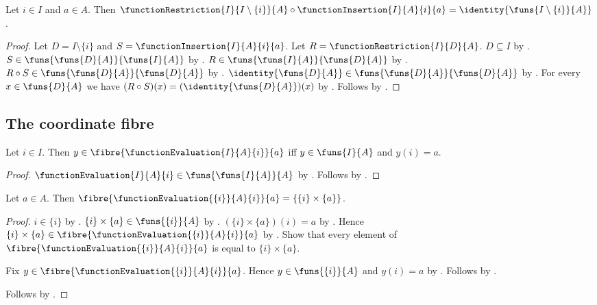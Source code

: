 \begin{theorem}\label{function_restriction_insertion}
    Let $i\in I$ and $a\in A$.
    Then $\functionRestriction{I}{I\setminus\{i\}}{A}\circ
        \functionInsertion{I}{A}{i}{a}=\identity{\funs{I\setminus\{i\}}{A}}$.
\end{theorem}
\begin{proof}
    Let $D=I\setminus\{i\}$ and $S=\functionInsertion{I}{A}{i}{a}$.
    Let $R=\functionRestriction{I}{D}{A}$.
    $D\subseteq I$ by .
    $S\in\funs{\funs{D}{A}}{\funs{I}{A}}$ by .
    $R\in\funs{\funs{I}{A}}{\funs{D}{A}}$ by .
    $R\circ S\in\funs{\funs{D}{A}}{\funs{D}{A}}$ by .
    $\identity{\funs{D}{A}}\in\funs{\funs{D}{A}}{\funs{D}{A}}$ by .
    For every $x\in\funs{D}{A}$ we have
        $(R\circ S)(x)=(\identity{\funs{D}{A}})(x)$ by
        .
    Follows by .
\end{proof}

\subsection{The coordinate fibre}

\begin{proposition}\label{function_evaluation_fibre}
    Let $i\in I$.
    Then $y\in\fibre{\functionEvaluation{I}{A}{i}}{a}$ iff
        $y\in\funs{I}{A}$ and $y(i)=a$.
\end{proposition}
\begin{proof}
    $\functionEvaluation{I}{A}{i}\in\funs{\funs{I}{A}}{A}$ by
        .
    Follows by .
\end{proof}

\begin{proposition}\label{function_evaluation_singleton_fibre}
    Let $a\in A$.
    Then $\fibre{\functionEvaluation{\{i\}}{A}{i}}{a}=\{\{i\}\times\{a\}\}$.
\end{proposition}
\begin{proof}
    $i\in\{i\}$ by .
    $\{i\}\times\{a\}\in\funs{\{i\}}{A}$ by
        .
    $(\{i\}\times\{a\})(i)=a$ by .
    Hence $\{i\}\times\{a\}\in\fibre{\functionEvaluation{\{i\}}{A}{i}}{a}$ by
        .
    Show that every element of $\fibre{\functionEvaluation{\{i\}}{A}{i}}{a}$
        is equal to $\{i\}\times\{a\}$.
    \begin{subproof}
        Fix $y\in\fibre{\functionEvaluation{\{i\}}{A}{i}}{a}$.
        Hence $y\in\funs{\{i\}}{A}$ and $y(i)=a$ by .
        Follows by .
    \end{subproof}
    Follows by .
\end{proof}


